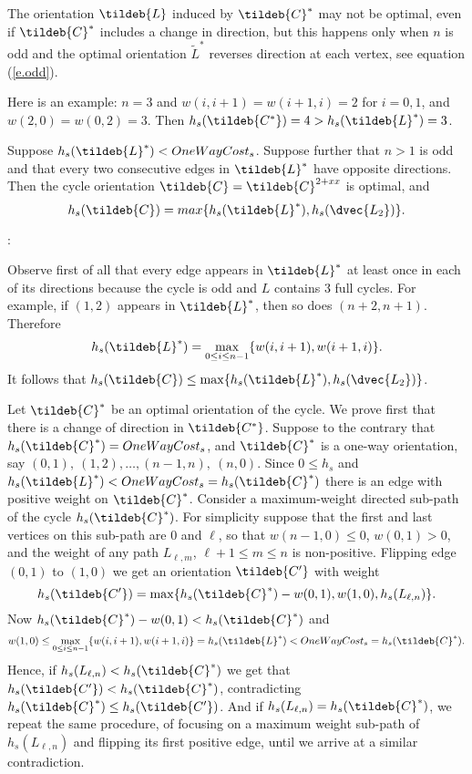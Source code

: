 \begin{remark} The orientation $\tildeb{L}$ induced 
	by $\tildeb{C}^*$ may not be optimal, even if $\tildeb{C}^*$ includes a change in direction,
	but this happens only when $n$ is odd and the optimal orientation $\tilde{L}^*$ reverses 
	direction at each vertex, see equation (\ref{e.odd}). 
\end{remark}
Here is an example: $n=3$ and $w(i,i+1)=w(i+1,i)=2$ for $i=0,1$,
and  $w(2,0)=w(0,2)=3$. Then  $h_s(\tildeb{C^*})=4> h_s(\tildeb{L}^*)=3$.


\begin{lemma}\label{l.odd}
	Suppose $h_s(\tildeb{L}^*) < OneWayCost_s$. Suppose further that  $n>1$ is odd and that every two consecutive edges in  $\tildeb{L}^*$ have opposite directions.
Then the cycle orientation $\tildeb{C}=\tildeb{C}^{2+xx}$ is optimal, and 
\begin{equation}\label{e.odd}
h_s(\tildeb{C}) = max \{h_s(\tildeb{L}^*), h_s(\dvec{L_2})\}.
\end{equation}
\end{lemma}
:

Observe first of all that every edge appears in  $\tildeb{L}^*$ at least once in each of its directions
because the cycle is odd and $L$ contains 3 full cycles. For example, if $(1,2)$ appears in $\tildeb{L}^*$, then so does
$(n+2,n+1)$. Therefore
$$h_s(\tildeb{L}^*)= \max_{0\leq i \leq n-1}\{w(i,i+1),w(i+1,i)\}.$$ 
It follows that $h_s(\tildeb{C})\leq \max \{h_s(\tildeb{L}^*), h_s(\dvec{L_2})\}$.

Let $\tildeb{C}^*$ be an optimal orientation of the cycle. 
We prove first that there is a change of direction in $\tildeb{C^*}$. 
Suppose to the contrary that $h_s(\tildeb{C}^*)=OneWayCost_s$, and  $\tildeb{C}^*$
is a one-way orientation, say $(0,1),\ (1,2),\ldots , (n-1,n),\ (n,0)$.
Since $0\leq h_s$ and $h_s(\tildeb{L}^*) <  OneWayCost_s=h_s(\tildeb{C}^*)$ there is an edge with positive weight on $\tildeb{C}^{*}$. 
Consider a maximum-weight directed sub-path of the cycle $h_s(\tildeb{C}^{*})$. For simplicity suppose that the first and last vertices on this 
sub-path are 
$0$ and $\ell$, so that  $w(n-1,0) \leq 0$, $w(0,1)>0$, and the weight of any path $L_{\ell,m}$, $\ell+1 \leq m \leq n$ is non-positive.
Flipping edge $(0,1)$ to $(1,0)$ we get an orientation 
$\tildeb{C'}$ with weight 
$$h_s(\tildeb{C'})=\max \{h_s(\tildeb{C}^{*})-w(0,1), w(1,0), h_s(L_{\ell,n})\}.$$
Now $h_s(\tildeb{C}^{*})-w(0,1)<h_s(\tildeb{C}^{*})$ and 
$$w(1,0)\leq \max_{0\leq i \leq n-1}\{w(i,i+1),w(i+1,i)\}= h_s(\tildeb{L}^*) <OneWayCost_s = h_s(\tildeb{C}^{*}).$$ 
Hence, if $h_s(L_{\ell,n})<h_s(\tildeb{C}^{*})$ we get
that $h_s(\tildeb{C'})<h_s(\tildeb{C}^{*})$, contradicting $h_s(\tildeb{C}^{*})\leq h_s(\tildeb{C'})$. And if $h_s(L_{\ell,n}) = h_s(\tildeb{C}^{*})$,
we repeat the same procedure, of 
focusing on a maximum weight sub-path of $h_s(L_{\ell,n})$ and flipping its first 
positive edge,
until we arrive at a similar contradiction.

